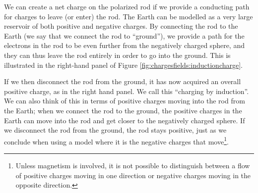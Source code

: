 We can create a net charge on the polarized rod if we provide a conducting path for charges to leave (or enter) the rod. The Earth can be modelled as a very large reservoir of both positive and negative charges. By connecting the rod to the Earth (we say that we connect the rod to ``ground''), we provide a path for the electrons in the rod to be even further from the negatively charged sphere, and they can thus leave the rod entirely in order to go into the ground. This is illustrated in the right-hand panel of Figure \ref{fig:chargesfields:inductioncharge}.

If we then disconnect the rod from the ground, it has now acquired an overall positive charge, as in the right hand panel. We call this ``charging by induction''. We can also think of this in terms of positive charges moving into the rod from the Earth; when we connect the rod to the ground, the positive charges in the Earth can move into the rod and get closer to the negatively charged sphere. If we disconnect the rod from the ground, the rod stays positive, just as we conclude when using a model where it is the negative charges that move\footnote{Unless magnetism is involved, it is not possible to distinguish between a flow of positive charges moving in one direction or negative charges moving in the opposite direction.}.


